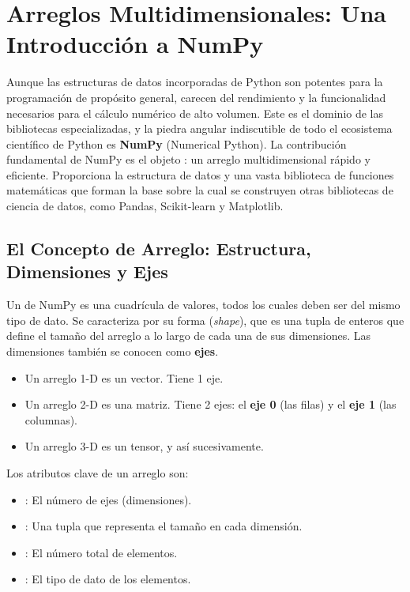 \section{Arreglos Multidimensionales: Una Introducción a NumPy}
\label{sec:numpy_intro}
Aunque las estructuras de datos incorporadas de Python son potentes para la programación de propósito general, carecen del rendimiento y la funcionalidad necesarios para el cálculo numérico de alto volumen. Este es el dominio de las bibliotecas especializadas, y la piedra angular indiscutible de todo el ecosistema científico de Python es \textbf{NumPy} (Numerical Python). La contribución fundamental de NumPy es el objeto \textbf{}: un arreglo multidimensional rápido y eficiente. Proporciona la estructura de datos y una vasta biblioteca de funciones matemáticas que forman la base sobre la cual se construyen otras bibliotecas de ciencia de datos, como Pandas, Scikit-learn y Matplotlib.

\subsection{El Concepto de Arreglo: Estructura, Dimensiones y Ejes}
\label{subsec:numpy_array_concept}
Un  de NumPy es una cuadrícula de valores, todos los cuales deben ser del mismo tipo de dato. Se caracteriza por su forma (\textit{shape}), que es una tupla de enteros que define el tamaño del arreglo a lo largo de cada una de sus dimensiones. Las dimensiones también se conocen como \textbf{ejes}.

\begin{itemize}
    \item Un arreglo 1-D es un vector. Tiene 1 eje.
    \item Un arreglo 2-D es una matriz. Tiene 2 ejes: el \textbf{eje 0} (las filas) y el \textbf{eje 1} (las columnas).
    \item Un arreglo 3-D es un tensor, y así sucesivamente.
\end{itemize}
Los atributos clave de un arreglo son:
\begin{itemize}
    \item {}: El número de ejes (dimensiones).
    \item {}: Una tupla que representa el tamaño en cada dimensión.
    \item {}: El número total de elementos.
    \item {}: El tipo de dato de los elementos.
\end{itemize}

